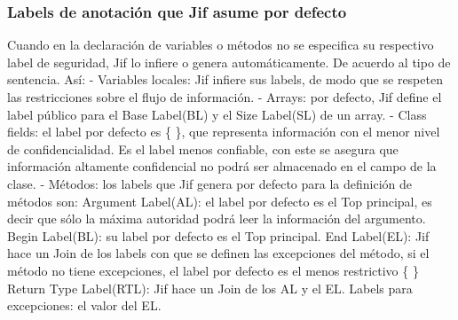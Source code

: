 \subsubsection{Labels de anotación que Jif asume por defecto}
\label{sssec:default-labels}
Cuando en la declaración de variables o métodos no se especifica su respectivo
label de seguridad, Jif lo infiere o genera automáticamente. De acuerdo al tipo
de sentencia. Así:\newline
- Variables locales: Jif infiere sus labels, de modo que se respeten las
restricciones sobre el flujo de información.\newline
- Arrays: por defecto, Jif define el label público para el Base Label(BL) y el
Size Label(SL) de un array.\newline
- Class fields: el label por defecto es \{ \}, que representa información con el
menor nivel de confidencialidad. Es el label menos confiable, con este se
asegura que información altamente confidencial no podrá ser almacenado en el
campo de la clase.\newline
- Métodos: los labels que Jif genera por defecto para la definición de
métodos son:\newline 
Argument Label(AL): el label por defecto es el Top principal, es decir que sólo
la máxima autoridad podrá leer la información del argumento.\newline 
Begin Label(BL): su label por defecto es el Top principal.\newline
End Label(EL): Jif hace un Join de los labels con que se definen las
excepciones del método, si el método no tiene excepciones, el label por defecto
es el menos restrictivo \{ \}\newline
Return Type Label(RTL): Jif hace un Join de los AL y el EL.\newline
Labels para excepciones: el valor del EL.\newline




